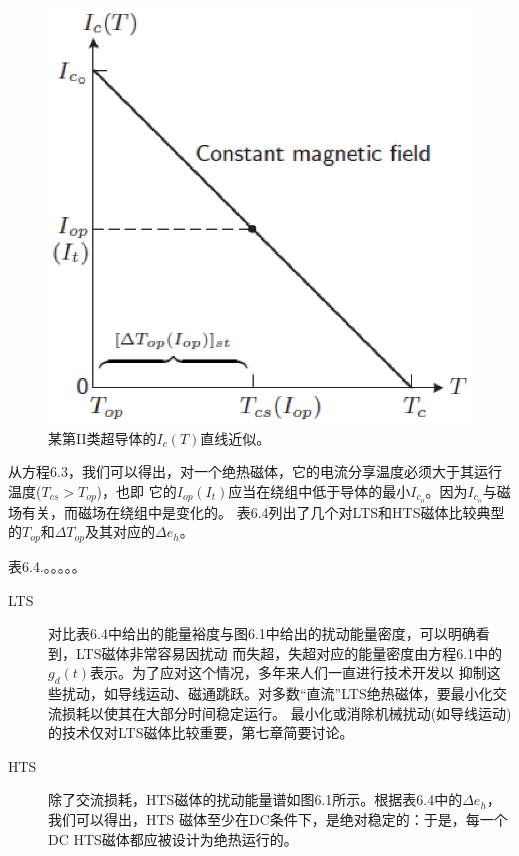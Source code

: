 \begin{figure}[htbp]
	\centering
	\includegraphics[scale=0.6]{chpt6/figs/fig6.2.eps}
	\caption{某第II类超导体的$I_c(T)$直线近似。}
\end{figure}
从方程6.3，我们可以得出，对一个绝热磁体，它的电流分享温度必须大于其运行温度($T_{cs}>T_{op}$)，也即
它的$I_{op}(I_t)$应当在绕组中低于导体的最小$I_{c_o}$。因为$I_{c_o}$与磁场有关，而磁场在绕组中是变化的。
表6.4列出了几个对LTS和HTS磁体比较典型的$T_{op}$和$\Delta T_{op}$及其对应的$\Delta e_h$。

表6.4.。。。。。

\begin{description}
	\item[LTS] 对比表6.4中给出的能量裕度与图6.1中给出的扰动能量密度，可以明确看到，LTS磁体非常容易因扰动
	而失超，失超对应的能量密度由方程6.1中的$g_d(t)$表示。为了应对这个情况，多年来人们一直进行技术开发以
	抑制这些扰动，如导线运动、磁通跳跃。对多数“直流”LTS绝热磁体，要最小化交流损耗以使其在大部分时间稳定运行。
	最小化或消除机械扰动(如导线运动)的技术仅对LTS磁体比较重要，第七章简要讨论。
	\item[HTS] 除了交流损耗，HTS磁体的扰动能量谱如图6.1所示。根据表6.4中的$\Delta e_h$，我们可以得出，HTS
	磁体至少在DC条件下，是绝对稳定的：于是，每一个DC HTS磁体都应被设计为绝热运行的。
\end{description}

